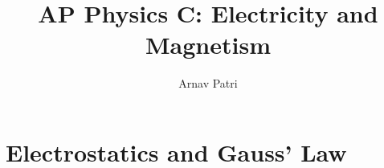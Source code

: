 \documentclass[A4, 12pt]{report}
\title{AP Physics C: Electricity and Magnetism}
\author{Arnav Patri}
\begin{document}
	\maketitle
	\chapter{Electrostatics and Gauss' Law}
		
\end{document}
